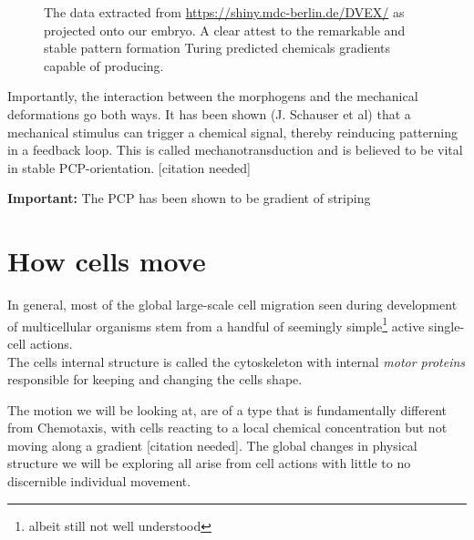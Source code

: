 \noindent

\begin{figure}[H]
    \centering
    \caption{The data extracted from \url{https://shiny.mdc-berlin.de/DVEX/} as projected onto our embryo. A clear attest to the remarkable and stable pattern formation Turing predicted chemicals gradients capable of producing.}
    \label{fig:MorphogenMap}
\end{figure}

Importantly, the interaction between the morphogens and the mechanical deformations go both ways. It has been shown (J. Schauser et al) that a mechanical stimulus can trigger a chemical signal, thereby reinducing patterning in a feedback loop. This is called mechanotransduction and is believed to be vital in stable PCP-orientation. [citation needed]


\textbf{Important:}
The PCP has been shown to be gradient of striping


\section{How cells move}

In general, most of the global large-scale cell migration seen during development of multicellular organisms stem from a handful of seemingly simple\footnote{albeit still not well understood} active single-cell actions.\cite{walck2014cell}\\
The cells internal structure is called the cytoskeleton with internal \textit{motor proteins} responsible for keeping and changing the cells shape.

The motion we will be looking at, are of a type that is fundamentally different from Chemotaxis, with cells reacting to a local chemical concentration but not moving along a gradient [citation needed]. The global changes in physical structure we will be exploring all arise from cell actions with little to no discernible individual movement.


